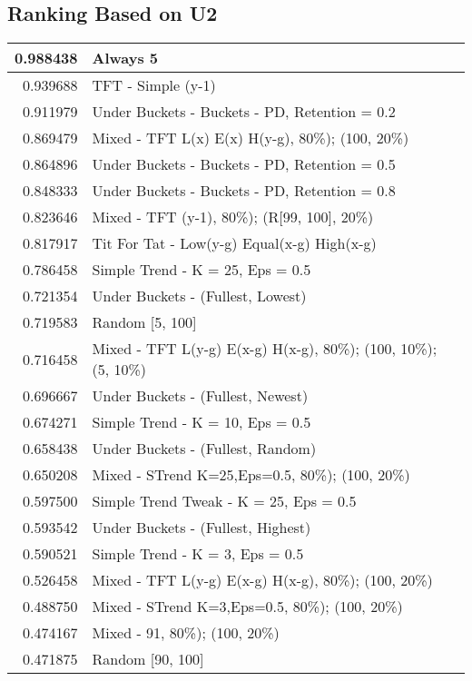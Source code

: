\begin{table}[!hbtp]
\subsection{Ranking Based on U2}
\begin{footnotesize}
\begin{tabular}{|r|l|}\hline  \label{U3results}
0.988438 & Always 5\\ \hline
0.939688 & TFT - Simple (y-1)\\ \hline
0.911979 & Under Buckets - Buckets - PD, Retention = 0.2\\ \hline
0.869479 & Mixed - {TFT L(x) E(x) H(y-g), 80\%); (100, 20\%)}\\ \hline
0.864896 & Under Buckets - Buckets - PD, Retention = 0.5\\ \hline
0.848333 & Under Buckets - Buckets - PD, Retention = 0.8\\ \hline
0.823646 & Mixed - {TFT (y-1), 80\%); (R[99, 100], 20\%)}\\ \hline
0.817917 & Tit For Tat - Low(y-g) Equal(x-g) High(x-g)\\ \hline
0.786458 & Simple Trend - K = 25, Eps = 0.5\\ \hline
0.721354 & Under Buckets - (Fullest, Lowest)\\ \hline
0.719583 & Random [5, 100]\\ \hline
0.716458 & Mixed - {TFT L(y-g) E(x-g) H(x-g), 80\%); (100, 10\%); (5, 10\%)}\\ \hline
0.696667 & Under Buckets - (Fullest, Newest)\\ \hline
0.674271 & Simple Trend - K = 10, Eps = 0.5\\ \hline
0.658438 & Under Buckets - (Fullest, Random)\\ \hline
0.650208 & Mixed - {STrend K=25,Eps=0.5, 80\%); (100, 20\%)}\\ \hline
0.597500 & Simple Trend Tweak - K = 25, Eps = 0.5\\ \hline
0.593542 & Under Buckets - (Fullest, Highest)\\ \hline
0.590521 & Simple Trend - K = 3, Eps = 0.5\\ \hline
0.526458 & Mixed - {TFT L(y-g) E(x-g) H(x-g), 80\%); (100, 20\%)}\\ \hline
0.488750 & Mixed - {STrend K=3,Eps=0.5, 80\%); (100, 20\%)}\\ \hline
0.474167 & Mixed - {91, 80\%); (100, 20\%)}\\ \hline
0.471875 & Random [90, 100]\\ \hline

\end{tabular}
\end{footnotesize}
\end{table}
